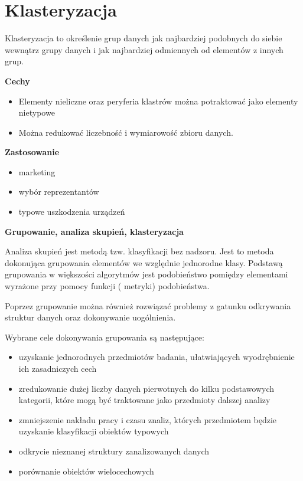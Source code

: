 \section{Klasteryzacja}
Klasteryzacja to określenie grup danych jak najbardziej podobnych do siebie wewnątrz grupy danych i jak najbardziej odmiennych od elementów z innych grup.

\textbf{Cechy}
\begin{itemize}
    \item Elementy nieliczne oraz peryferia klastrów można potraktować jako elementy nietypowe
    \item Można redukować liczebność i wymiarowość zbioru danych. 
\end{itemize}

\textbf{Zastosowanie}
\begin{itemize}
    \item marketing
    \item wybór reprezentantów
    \item typowe uszkodzenia urządzeń
\end{itemize}

\textbf{Grupowanie, analiza skupień, klasteryzacja}

Analiza skupień jest metodą tzw. klasyfikacji bez nadzoru. Jest to metoda dokonująca grupowania elementów we względnie jednorodne klasy. Podstawą grupowania w większości algorytmów jest podobieństwo pomiędzy elementami wyrażone przy pomocy funkcji ( metryki)  podobieństwa.

Poprzez grupowanie można również rozwiązać problemy z gatunku odkrywania struktur danych  oraz dokonywanie uogólnienia.

Wybrane cele dokonywania grupowania są następujące:
\begin{itemize}
    \item uzyskanie jednorodnych przedmiotów badania, ułatwiających wyodrębnienie ich zasadniczych cech
    \item zredukowanie dużej liczby danych pierwotnych do kilku podstawowych kategorii, które mogą być traktowane jako przedmioty dalszej analizy
    \item zmniejszenie nakładu pracy i czasu znaliz, których przedmiotem będzie uzyskanie klasyfikacji obiektów typowych
    \item odkrycie nieznanej struktury zanalizowanych danych
    \item porównanie obiektów wielocechowych
\end{itemize}


